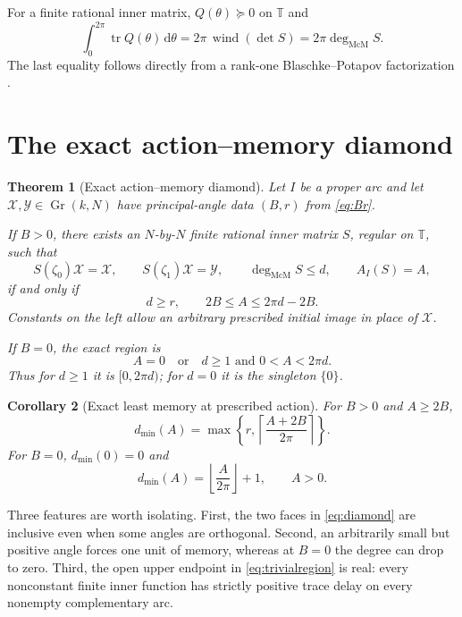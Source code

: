 \documentclass[11pt]{article}
\newtheorem{theorem}{Theorem}[section]
\newtheorem{corollary}[theorem]{Corollary}
\theoremstyle{definition}
\theoremstyle{remark}
\newcommand{\T}{\mathbb T}
\newcommand{\tr}{\operatorname{tr}}
\newcommand{\dd}{\mathrm d}
\newcommand{\mcdeg}{\deg_{\mathrm{McM}}}
\newcommand{\Gr}{\operatorname{Gr}}
\begin{document}
For a finite rational inner matrix, $Q(\theta)\succeq0$ on $\T$ and
\begin{equation}\label{eq:winding}
 \int_0^{2\pi}\tr Q(\theta)\,\dd\theta
 =2\pi\,\operatorname{wind}(\det S)
 =2\pi\mcdeg S.
\end{equation}
The last equality follows directly from a rank-one
Blaschke--Potapov factorization \cite{Potapov1955,
AlpayJorgensenLewkowicz2016}.

\section{The exact action--memory diamond}

\begin{theorem}[Exact action--memory diamond]\label{thm:diamond}
Let $I$ be a proper arc and let $\mathcal X,\mathcal Y\in\Gr(k,N)$ have
principal-angle data $(B,r)$ from \eqref{eq:Br}.

If $B>0$, there exists an $N$-by-$N$ finite rational inner matrix $S$,
regular on $\T$, such that
\[
 S(\zeta_0)\mathcal X=\mathcal X,
 \qquad S(\zeta_1)\mathcal X=\mathcal Y,
 \qquad \mcdeg S\le d,
 \qquad A_I(S)=A,
\]
if and only if
\begin{equation}\label{eq:diamond}
 \boxed{d\ge r,\qquad 2B\le A\le2\pi d-2B.}
\end{equation}
Constants on the left allow an arbitrary prescribed initial image in place
of $\mathcal X$.

If $B=0$, the exact region is
\begin{equation}\label{eq:trivialregion}
 A=0\quad\text{or}\quad d\ge1\text{ and }0<A<2\pi d.
\end{equation}
Thus for $d\ge1$ it is $[0,2\pi d)$; for $d=0$ it is the singleton
$\{0\}$.
\end{theorem}

\begin{corollary}[Exact least memory at prescribed action]
\label{cor:dmin}
For $B>0$ and $A\ge2B$,
\begin{equation}\label{eq:dmin}
 d_{\min}(A)=
 \max\left\{r,
 \left\lceil\frac{A+2B}{2\pi}\right\rceil\right\}.
\end{equation}
For $B=0$, $d_{\min}(0)=0$ and
\[
 d_{\min}(A)=\left\lfloor\frac{A}{2\pi}\right\rfloor+1,
 \qquad A>0.
\]
\end{corollary}

Three features are worth isolating.  First, the two faces in
\eqref{eq:diamond} are inclusive even when some angles are orthogonal.
Second, an arbitrarily small but positive angle forces one unit of memory,
whereas at $B=0$ the degree can drop to zero.  Third, the open upper endpoint
in \eqref{eq:trivialregion} is real: every nonconstant finite inner function
has strictly positive trace delay on every nonempty complementary arc.
\end{document}
